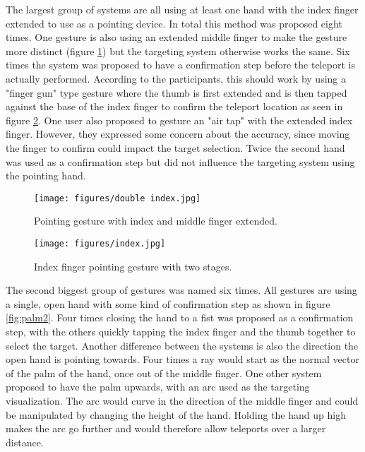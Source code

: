 The largest group of systems are all using at least one hand with the index finger extended to use as a pointing device. In total this method was proposed eight times. One gesture is also using an extended middle finger to make the gesture more distinct (figure \ref{fig:index2}) but the targeting system otherwise works the same. Six times the system was proposed to have a confirmation step before the teleport is actually performed. According to the participants, this should work by using a "finger gun" type gesture where the thumb is first extended and is then tapped against the base of the index finger to confirm the teleport location as seen in figure \ref{fig:index}. One user also proposed to gesture an "air tap" with the extended index finger. However, they expressed some concern about the accuracy, since moving the finger to confirm could impact the target selection. Twice the second hand was used as a confirmation step but did not influence the targeting system using the pointing hand.

\begin{figure}[!ht]
    \centering
    \texttt{[image: figures/double index.jpg]}
    \caption{Pointing gesture with index and middle finger extended.}
    \label{fig:index2}
\end{figure}

\begin{figure}[!ht]
    \centering
    \texttt{[image: figures/index.jpg]}
    \caption{Index finger pointing gesture with two stages.}
    \label{fig:index}
\end{figure}


The second biggest group of gestures was named six times. All gestures are using a single, open hand with some kind of confirmation step as shown in figure \ref{fig:palm2}. Four times closing the hand to a fist was proposed as a confirmation step, with the others quickly tapping the index finger and the thumb together to select the target. Another difference between the systems is also the direction the open hand is pointing towards. Four times a ray would start as the normal vector of the palm of the hand, once out of the middle finger. One other system proposed to have the palm upwards, with an arc used as the targeting visualization. The arc would curve in the direction of the middle finger and could be manipulated by changing the height of the hand. Holding the hand up high makes the arc go further and would therefore allow teleports over a larger distance.


